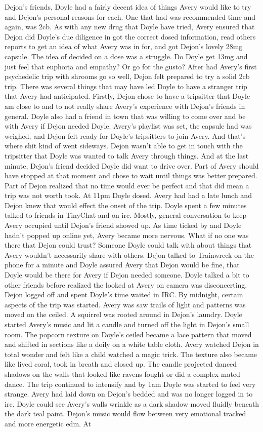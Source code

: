 \documentclass[12pt]{book}
\begin{document}
Dejon's friends, Doyle had a fairly decent idea of things Avery would like to try and Dejon's personal reasons for each. One that had was recommended time and again, was 2cb. As with any new drug that Doyle have tried, Avery ensured that Dejon did Doyle's due diligence in got the correct dosed information, read others reports to get an idea of what Avery was in for, and got Dejon's lovely 28mg capsule. The idea of decided on a dose was a struggle. Do Doyle get 13mg and just feel that euphoria and empathy? Or go for the gusto? After had Avery's first psychedelic trip with shrooms go so well, Dejon felt prepared to try a solid 2cb trip. There was several things that may have led Doyle to have a stranger trip that Avery had anticipated. Firstly, Dejon chose to have a tripsitter that Doyle am close to and to not really share Avery's experience with Dejon's friends in general. Doyle also had a friend in town that was willing to come over and be with Avery if Dejon needed Doyle. Avery's playlist was set, the capsule had was weighed, and Dejon felt ready for Doyle's tripsitters to join Avery. And that's where shit kind of went sideways. Dejon wasn't able to get in touch with the tripsitter that Doyle was wanted to talk Avery through things. And at the last minute, Dejon's friend decided Doyle did want to drive over. Part of Avery should have stopped at that moment and chose to wait until things was better prepared. Part of Dejon realized that no time would ever be perfect and that did mean a trip was not worth took. At 11pm Doyle dosed. Avery had had a late lunch and Dejon knew that would effect the onset of the trip. Doyle spent a few minutes talked to friends in TinyChat and on irc. Mostly, general conversation to keep Avery occupied until Dejon's friend showed up. As time ticked by and Doyle hadn't popped up online yet, Avery became more nervous. What if no one was there that Dejon could trust? Someone Doyle could talk with about things that Avery wouldn't necessarily share with others. Dejon talked to Trainwreck on the phone for a minute and Doyle assured Avery that Dejon would be fine, that Doyle would be there for Avery if Dejon needed someone. Doyle talked a bit to other friends before realized the looked at Avery on camera was disconcerting. Dejon logged off and spent Doyle's time waited in IRC. By midnight, certain aspects of the trip was started. Avery was saw trails of light and patterns was moved on the ceiled. A squirrel was rooted around in Dejon's laundry. Doyle started Avery's music and lit a candle and turned off the light in Dejon's small room. The popcorn texture on Doyle's ceiled became a lace pattern that moved and shifted in sections like a doily on a white table cloth. Avery watched Dejon in total wonder and felt like a child watched a magic trick. The texture also became like lived coral, took in breath and closed up. The candle projected danced shadows on the walls that looked like ravens fought or did a complex mated dance. The trip continued to intensify and by 1am Doyle was started to feel very strange. Avery had laid down on Dejon's bedded and was no longer logged in to irc. Doyle could see Avery's walls wrinkle as a dark shadow moved fluidly beneath the dark teal paint. Dejon's music would flow between very emotional tracked and more energetic edm. At 
\end{document}
